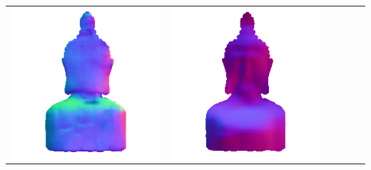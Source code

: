 \begin{center}
\begin{tabularx}{\linewidth}{@{}Y@{}Y@{}Y@{}Y@{}Y@{}Y@{}}
\includegraphics[width=\linewidth]{semisynthetic/20160617_16_marrnet_out.png} &
\includegraphics[width=\linewidth]{semisynthetic/20160617_16_ef_out.png} \\

\end{tabularx}
\end{center}
